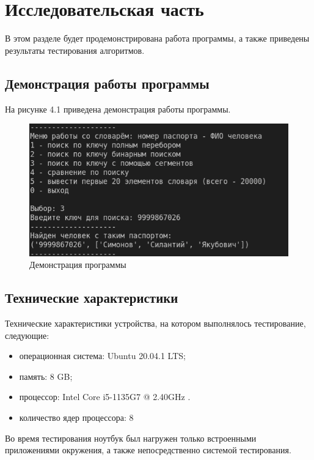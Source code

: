 \chapter{Исследовательская часть}
В этом разделе будет продемонстрирована работа программы, а также
приведены результаты тестирования алгоритмов.

\section{Демонстрация работы программы}
На рисунке 4.1 приведена демонстрация работы программы.

\FloatBarrier
\begin{figure}[h]
	\begin{center}
		\includegraphics[]{inc/demostrate.png}
	\end{center}
	\caption{Демонстрация программы}
\end{figure}
\FloatBarrier


\section{Технические характеристики}
Технические характеристики устройства, на котором выполнялось тестирование, следующие:
\begin{itemize}
	\item операционная система: Ubuntu 20.04.1 LTS;
	\item память: 8 GB;
	\item процессор: Intel Core i5-1135G7 @ 2.40GHz \cite{intel}.
	\item количество ядер процессора: 8
\end{itemize}

Во время тестирования ноутбук был нагружен только встроенными приложениями окружения, а также непосредственно системой тестирования.

